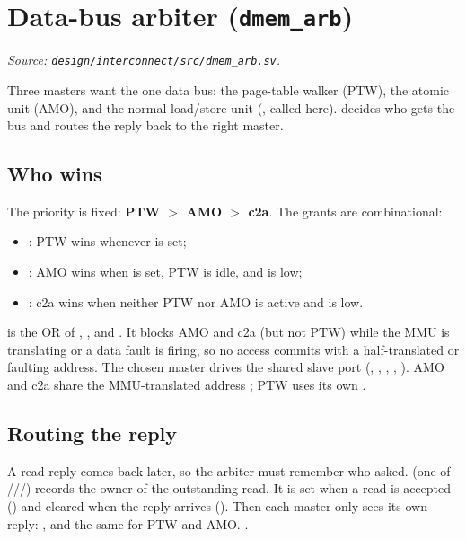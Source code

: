 \section{Data-bus arbiter (\texttt{dmem\_arb})}
\textit{Source: \texttt{design/interconnect/src/dmem\_arb.sv}.}

Three masters want the one data bus: the page-table walker (PTW), the atomic unit
(AMO), and the normal load/store unit (, called  here).
 decides who gets the bus and routes the reply back to the right
master.

\subsection{Who wins}
The priority is fixed: \textbf{PTW $>$ AMO $>$ c2a}. The grants are
combinational:
\begin{itemize}[leftmargin=1.4em,itemsep=1pt]
\item {}: PTW wins whenever  is set;
\item {}: AMO wins when  is set, PTW is idle,
  and  is low;
\item {}: c2a wins when neither PTW nor AMO is active and
   is low.
\end{itemize}
 is the OR of ,
, and . It blocks AMO and c2a (but
not PTW) while the MMU is
translating or a data fault is firing, so no access commits with a half-translated
or faulting address. The chosen master drives the shared slave port 
(, , , , ). AMO
and c2a share the MMU-translated address ; PTW uses its own
.

\subsection{Routing the reply}
A read reply comes back later, so the arbiter must remember who asked.
 (one of ///)
records the owner of the outstanding read. It is set when a read is accepted
() and cleared when the
reply arrives (). Then each master only sees its own reply:
, and the
same for PTW and AMO. .

